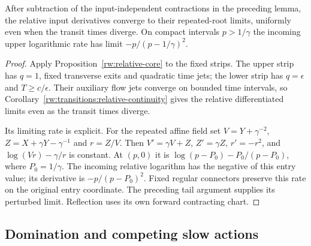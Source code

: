 \begin{lemma}\label{rw:infinity:repeated-tail}
After subtraction of the input-independent contractions in the
preceding lemma, the relative input derivatives converge to their
repeated-root limits, uniformly even when the transit times diverge.
On compact intervals $p>1/\gamma$ the incoming upper logarithmic
rate has limit $-p/(p-1/\gamma)^2$.
\end{lemma}
\begin{proof}
Apply Proposition~\ref{rw:relative-core} to the fixed strips.
The upper strip has $q=1$, fixed transverse exits and quadratic time
jets; the lower strip has $q=\epsilon$ and $T\ge c/\epsilon$.
Their auxiliary flow jets converge on bounded time intervals, so
Corollary~\ref{rw:transitions:relative-continuity} gives the
relative differentiated limits even as the transit times diverge.

Its limiting rate is explicit. For the repeated affine field set
$V=Y+\gamma^{-2}$, $Z=X+\gamma Y-\gamma^{-1}$ and $r=Z/V$.
Then $V'=\gamma V+Z$, $Z'=\gamma Z$, $r'=-r^2$, and
$\log(Vr)-\gamma/r$ is constant. At $(p,0)$ it is
$\log(p-P_0)-P_0/(p-P_0)$, where $P_0=1/\gamma$.
The incoming relative logarithm has the negative of this entry value;
its derivative is $-p/(p-P_0)^2$. Fixed regular connectors preserve
this rate on the original entry coordinate. The preceding tail
argument supplies its perturbed limit. Reflection uses its own forward
contracting chart.
\end{proof}

\subsection{Domination and competing slow actions}

